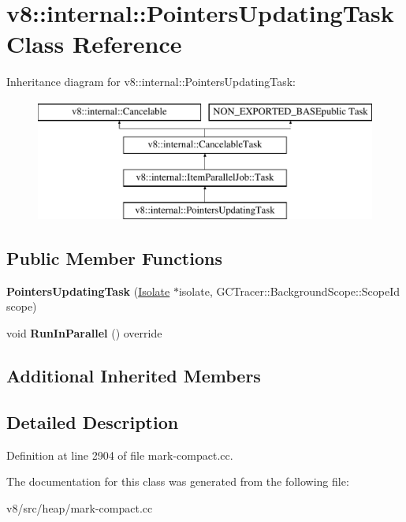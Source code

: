 \hypertarget{classv8_1_1internal_1_1PointersUpdatingTask}{}\section{v8\+:\+:internal\+:\+:Pointers\+Updating\+Task Class Reference}
\label{classv8_1_1internal_1_1PointersUpdatingTask}
Inheritance diagram for v8\+:\+:internal\+:\+:Pointers\+Updating\+Task\+:\begin{figure}[H]
\begin{center}
\leavevmode
\includegraphics[height=4.000000cm]{classv8_1_1internal_1_1PointersUpdatingTask}
\end{center}
\end{figure}
\subsection*{Public Member Functions}
\begin{DoxyCompactItemize}
\item 
\mbox{\label{classv8_1_1internal_1_1PointersUpdatingTask_a5212d000396d8c15b80bd58e317ceb70}} 
{\bfseries Pointers\+Updating\+Task} (\mbox{\hyperlink{classv8_1_1internal_1_1Isolate}{Isolate}} $\ast$isolate, G\+C\+Tracer\+::\+Background\+Scope\+::\+Scope\+Id scope)
\item 
\mbox{\label{classv8_1_1internal_1_1PointersUpdatingTask_a1c3a7e17764cd3bf41792dd2e818b4cc}} 
void {\bfseries Run\+In\+Parallel} () override
\end{DoxyCompactItemize}
\subsection*{Additional Inherited Members}


\subsection{Detailed Description}


Definition at line 2904 of file mark-\/compact.\+cc.



The documentation for this class was generated from the following file\+:\begin{DoxyCompactItemize}
\item 
v8/src/heap/mark-\/compact.\+cc\end{DoxyCompactItemize}
